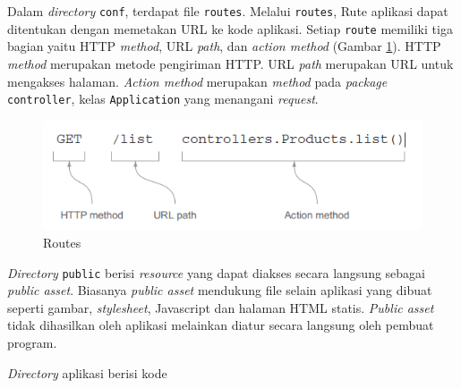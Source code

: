 Dalam \textit{directory} \texttt{conf}, terdapat file \texttt{routes}. Melalui \texttt{routes}, Rute aplikasi dapat ditentukan dengan memetakan URL ke kode aplikasi. Setiap \texttt{route} memiliki tiga bagian yaitu HTTP \textit{method}, URL \textit{path}, dan \textit{action method} (Gambar \ref{fig:2_routes_example}). HTTP \textit{method} merupakan metode pengiriman HTTP. URL \textit{path} merupakan URL untuk mengakses halaman. \textit{Action method} merupakan \textit{method} pada \textit{package} \texttt{controller}, kelas \texttt{Application} yang menangani \textit{request}.

\begin{figure}[H]
	\centering
	\includegraphics[scale=0.5]{Gambar/contoh-routes}
	\caption{Routes} 
	\label{fig:2_routes_example}
\end{figure}

\textit{Directory} \texttt{public} berisi \textit{resource} yang dapat diakses secara langsung sebagai \textit{public asset}. Biasanya \textit{public asset} mendukung file selain aplikasi yang dibuat seperti gambar, \textit{stylesheet}, Javascript dan halaman HTML statis. \textit{Public asset} tidak dihasilkan oleh aplikasi melainkan diatur secara langsung oleh pembuat program.

\textit{Directory} aplikasi berisi kode
